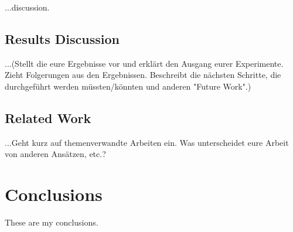 \documentclass[pdftex,english,oribibl]{llncs}
\begin{document}
  ...discussion.
  
    \subsection{Results Discussion} 
    ...(Stellt die eure Ergebnisse vor und erklärt den Ausgang eurer Experimente. Zieht Folgerungen aus den Ergebnissen. Beschreibt die nächsten Schritte, die durchgeführt werden müssten/könnten und anderen "Future Work".)
    
    \subsection{Related Work}
    ...Geht kurz auf themenverwandte Arbeiten ein. Was unterscheidet eure Arbeit von anderen Ansätzen, etc.?
    
    \citep{rojas2017detailed}

\section{Conclusions}\label{sec:conclusions}

  These are my conclusions.
  

\end{document}
